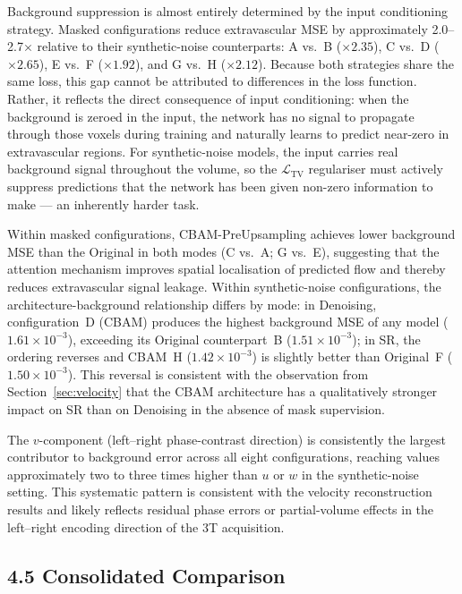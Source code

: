 Background suppression is almost entirely determined by the input conditioning strategy.  Masked
configurations reduce extravascular MSE by approximately 2.0--2.7$\times$ relative to their
synthetic-noise counterparts: A vs.\ B ($\times 2.35$), C vs.\ D ($\times 2.65$), E vs.\ F
($\times 1.92$), and G vs.\ H ($\times 2.12$).  Because both strategies share the same loss,
this gap cannot be attributed to differences in the loss function.  Rather, it reflects the
direct consequence of input conditioning: when the background is zeroed in the input, the
network has no signal to propagate through those voxels during training and naturally learns to
predict near-zero in extravascular regions.  For synthetic-noise models, the input carries real
background signal throughout the volume, so the $\mathcal{L}_\text{TV}$ regulariser must
actively suppress predictions that the network has been given non-zero information to make ---
an inherently harder task.

Within masked configurations, CBAM-PreUpsampling achieves lower background MSE than the Original
in both modes (C vs.\ A; G vs.\ E), suggesting that the attention mechanism improves spatial
localisation of predicted flow and thereby reduces extravascular signal leakage.  Within
synthetic-noise configurations, the architecture-background relationship differs by mode: in
Denoising, configuration~D (CBAM) produces the highest background MSE of any model
($1.61{\times}10^{-3}$), exceeding its Original counterpart~B ($1.51{\times}10^{-3}$); in SR,
the ordering reverses and CBAM~H ($1.42{\times}10^{-3}$) is slightly better than Original~F
($1.50{\times}10^{-3}$).  This reversal is consistent with the observation from
Section~\ref{sec:velocity} that the CBAM architecture has a qualitatively stronger impact on
SR than on Denoising in the absence of mask supervision.

The $v$-component (left--right phase-contrast direction) is consistently the largest contributor
to background error across all eight configurations, reaching values approximately two to three
times higher than $u$ or $w$ in the synthetic-noise setting.  This systematic pattern is
consistent with the velocity reconstruction results and likely reflects residual phase errors
or partial-volume effects in the left--right encoding direction of the 3T acquisition.

\subsection*{4.5 Consolidated Comparison}

